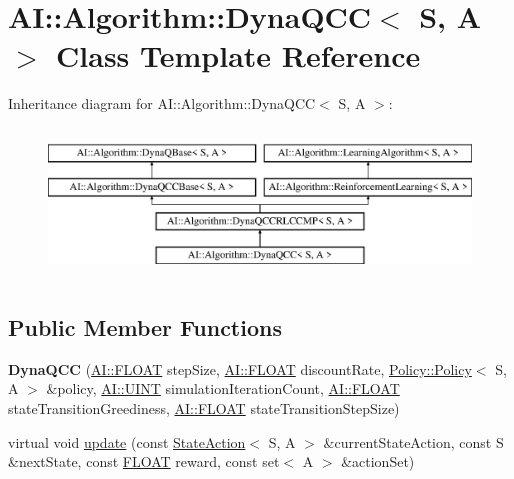 \hypertarget{classAI_1_1Algorithm_1_1DynaQCC}{\section{A\-I\-:\-:Algorithm\-:\-:Dyna\-Q\-C\-C$<$ S, A $>$ Class Template Reference}
\label{classAI_1_1Algorithm_1_1DynaQCC}
}
Inheritance diagram for A\-I\-:\-:Algorithm\-:\-:Dyna\-Q\-C\-C$<$ S, A $>$\-:\begin{figure}[H]
\begin{center}
\leavevmode
\includegraphics[height=4.000000cm]{classAI_1_1Algorithm_1_1DynaQCC}
\end{center}
\end{figure}
\subsection*{Public Member Functions}
\begin{DoxyCompactItemize}
\item 
\hypertarget{classAI_1_1Algorithm_1_1DynaQCC_aab347f88243e3690cbc856347ed37378}{{\bfseries Dyna\-Q\-C\-C} (\hyperlink{namespaceAI_a41b74884a20833db653dded3918e05c3}{A\-I\-::\-F\-L\-O\-A\-T} step\-Size, \hyperlink{namespaceAI_a41b74884a20833db653dded3918e05c3}{A\-I\-::\-F\-L\-O\-A\-T} discount\-Rate, \hyperlink{classAI_1_1Algorithm_1_1Policy_1_1Policy}{Policy\-::\-Policy}$<$ S, A $>$ \&policy, \hyperlink{namespaceAI_ab6e14dc1e659854858a87e511f1439ec}{A\-I\-::\-U\-I\-N\-T} simulation\-Iteration\-Count, \hyperlink{namespaceAI_a41b74884a20833db653dded3918e05c3}{A\-I\-::\-F\-L\-O\-A\-T} state\-Transition\-Greediness, \hyperlink{namespaceAI_a41b74884a20833db653dded3918e05c3}{A\-I\-::\-F\-L\-O\-A\-T} state\-Transition\-Step\-Size)}\label{classAI_1_1Algorithm_1_1DynaQCC_aab347f88243e3690cbc856347ed37378}

\item 
virtual void \hyperlink{classAI_1_1Algorithm_1_1DynaQCC_ae23b8f0afbb9fc5024aef9ce720c9b84}{update} (const \hyperlink{classAI_1_1StateAction}{State\-Action}$<$ S, A $>$ \&current\-State\-Action, const S \&next\-State, const \hyperlink{namespaceAI_a41b74884a20833db653dded3918e05c3}{F\-L\-O\-A\-T} reward, const set$<$ A $>$ \&action\-Set)
\end{DoxyCompactItemize}
